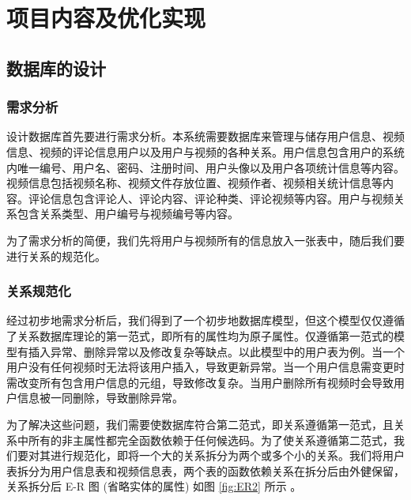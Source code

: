 \chapter{项目内容及优化实现}\label{sec:algorithm}

\section{数据库的设计}
 
\subsection{需求分析}
设计数据库首先要进行需求分析\cite{gamma1995design}。本系统需要数据库来管理与储存用户信息、视频信息、视频的评论信息用户以及用户与视频的各种关系。用户信息包含用户的系统内唯一编号、用户名、密码、注册时间、用户头像以及用户各项统计信息等内容。视频信息包括视频名称、视频文件存放位置、视频作者、视频相关统计信息等内容。评论信息包含评论人、评论内容、评论种类、评论视频等内容。用户与视频关系包含关系类型、用户编号与视频编号等内容。

为了需求分析的简便，我们先将用户与视频所有的信息放入一张表中，随后我们要进行关系的规范化。

\subsection{关系规范化}

经过初步地需求分析后，我们得到了一个初步地数据库模型，但这个模型仅仅遵循了关系数据库理论的第一范式\cite{codd1972further}，即所有的属性均为原子属性。仅遵循第一范式的模型有插入异常、删除异常以及修改复杂等缺点。以此模型中的用户表为例。当一个用户没有任何视频时无法将该用户插入，导致更新异常。当一个用户信息需变更时需改变所有包含用户信息的元组，导致修改复杂。当用户删除所有视频时会导致用户信息被一同删除，导致删除异常。

为了解决这些问题，我们需要使数据库符合第二范式\cite{codd1972further}，即关系遵循第一范式，且关系中所有的非主属性都完全函数依赖于任何候选码。为了使关系遵循第二范式，我们要对其进行规范化，即将一个大的关系拆分为两个或多个小的关系。我们将用户表拆分为用户信息表和视频信息表，两个表的函数依赖关系在拆分后由外健保留，关系拆分后 E-R 图 (省略实体的属性) 如图 \ref{fig:ER2} 所示 。

